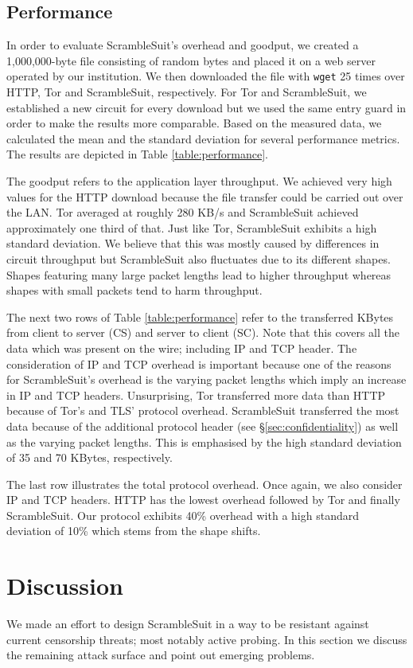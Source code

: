 \documentclass{sig-alternate}
\newcommand{\pt}{\textsf{ScrambleSuit}}
\numberwithin{enumi}{section}
\numberwithin{notesctr}{section}
\begin{document}
{\subsection{Performance}
In order to evaluate \pt{}'s overhead and goodput, we created a 1,000,000-byte file consisting of
random bytes and placed it on a web server operated by our institution. We then downloaded the file
with \texttt{wget} 25 times over HTTP, Tor and \pt{}, respectively. For Tor and \pt{}, we
established a new circuit for every download but we used the same entry guard in order to make the
results more comparable. Based on the measured data, we calculated the mean  and the standard
deviation  for several performance metrics. The results are depicted in Table
\ref{table:performance}.


The goodput refers to the application layer throughput. We achieved very high values for the HTTP
download because the file transfer could be carried out over the LAN. Tor averaged at roughly 280
KB/s and \pt{} achieved approximately one third of that. Just like Tor, \pt{} exhibits a high
standard deviation. We believe that this was mostly caused by differences in circuit throughput but
\pt{} also fluctuates due to its different shapes. Shapes featuring many large packet lengths lead
to higher throughput whereas shapes with small packets tend to harm throughput.

The next two rows of Table \ref{table:performance} refer to the transferred KBytes from client to
server (CS) and server to client (SC). Note that this covers all the data which was
present on the wire; including IP and TCP header. The consideration of IP and TCP overhead is
important because one of the reasons for \pt{}'s overhead is the varying packet lengths which
imply an increase in IP and TCP headers. Unsurprising, Tor transferred more data than HTTP because
of Tor's and TLS' protocol overhead. \pt{} transferred the most data because of the additional
protocol header (see \S \ref{sec:confidentiality}) as well as the varying packet lengths.
This is emphasised by the high standard deviation of 35 and 70 KBytes, respectively.

The last row illustrates the total protocol overhead. Once again, we also consider IP and TCP
headers. HTTP has the lowest overhead followed by Tor and finally \pt{}. Our protocol exhibits 40\%
overhead with a high standard deviation of 10\% which stems from the shape shifts.



\section{Discussion}
\label{sec:discussion}
We made an effort to design \pt{} in a way to be resistant against current censorship threats; most
notably active probing. In this section we discuss the remaining attack surface and point out
emerging problems.

}
\end{document}
